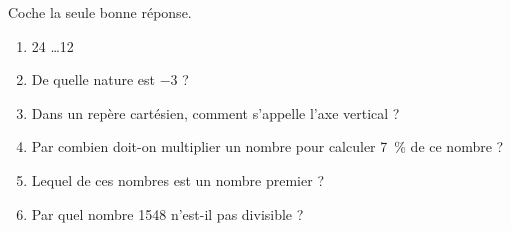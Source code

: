 \documentclass[parskip=half-,DIV=12,twoside=semi, 12pt]{scrartcl}
\newcounter{l}
\begin{document}
\begin{connaitre}[points=11]
    Coche la seule bonne réponse.
    \begin{enumerate}
        \item 24 \hspace{1em} \ldots \hspace{1em}12
        \item De quelle nature est \(-3\) ?  
        \item Dans un repère cartésien, comment s'appelle l'axe vertical ?
        \item Par combien doit-on multiplier un nombre pour calculer \SI{7}{\%} de ce nombre ?
        \item Lequel de ces nombres est un nombre premier ?
        \item Par quel nombre \num{1548} n'est-il pas divisible ?

\end{enumerate}
\end{connaitre}
\end{document}
